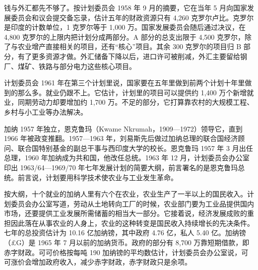 钱与外汇都先不够了。按计划委员会 1958 年 9 月的摘要，它在当年 5 月向国家发展委员会和议会提交备忘录，估计五年的财政资源只有 4,260 克罗尔卢比\cite{india1958}。克罗尔是印度的计数单位，1 克罗尔等于 1,000 万\cite{india1956}。国家发展委员会随后通过决议，在 4,800 克罗尔的上限内把计划分成两部分\cite{india1958}。A 部分的总支出限于 4,500 克罗尔，除了与农业增产直接相关的项目，还有“核心”项目。其余 300 克罗尔的项目归 B 部分，有了更多资源才做\cite{india1958}。外汇储备下降以后，进口许可被削减，外汇主要留给钢厂、煤矿、铁路与部分电力这些核心项目\cite{india1958}。

计划委员会 1961 年在第三个计划里说，国家要在五年里做到前两个计划十年里做到的那么多\cite{india1961}。就业仍跟不上。它估计，计划里的项目可以提供约 1,400 万个新增就业，同期劳动力却要增加约 1,700 万\cite{india1961}。不足的部分，它打算靠农村的大规模工程、乡村与小工业等办法解决\cite{india1961}。

加纳 1957 年独立，恩克鲁玛（Kwame Nkrumah，1909—1972）领导它，直到 1966 年被政变推翻\cite{loc41,gnd41}。1957—1963 年，刘易斯先后做过加纳总理的联合国经济顾问、联合国特别基金的副总干事与西印度大学的校长\cite{lewisbio1979}。恩克鲁玛 1957 年 3 月出任总理，1960 年加纳成为共和国，他改任总统\cite{loc41}。1963 年 12 月，计划委员会办公室印出 1963/64—1969/70 年七年发展计划的简要大纲，前言署名的是恩克鲁玛总统\cite{ghana1963}。前言说，计划要用科学技术使农业与工业发生革命\cite{ghana1963}。

按大纲，十个就业的加纳人里有六个在农业，农业生产了一半以上的国民收入\cite{ghana1963}。计划委员会办公室写道，劳动从土地转向工厂的时候，农业部门要为工业品提供国内市场，还要提供工业发展所需储蓄的相当大一部分\cite{ghana1963}。它接着说，经济发展成败的重担因此落在从事农业的人身上，农业的这种转变是国民收入持续增长的先决条件\cite{ghana1963}。七年的总投资估计为 10.16 亿加纳镑，其中政府 4.76 亿，私人 5.40 亿\cite{ghana1963}。加纳镑（£G）是 1965 年 7 月以前的加纳货币\cite{wbstab1967}。政府的部分有 8,700 万靠短期借款，即赤字财政\cite{ghana1963}。可可价格按每吨 190 加纳镑的平均数估计，计划委员会办公室说，可可涨价会增加政府收入，减少赤字财政，赤字财政只是余项\cite{ghana1963}。

